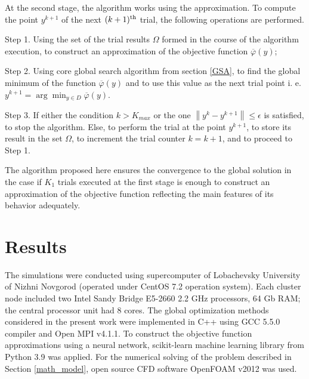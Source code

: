 \documentclass[sensors,article,submit,moreauthors,pdftex]{Definitions/mdpi}
\begin{document}
At the second stage, the algorithm works using the approximation. To compute the point $y^{k+1}$ of the next $(k+1)^{\rm th}$ trial, the following operations are performed.

Step 1. Using the set of the trial results $\Omega$ formed in the course of the algorithm execution, to construct an approximation of the objective function $\overline{\varphi}(y)$;

Step 2. Using core global search algorithm from section \ref{GSA}, to find the global minimum of the function $\overline{\varphi}(y)$ and to use this value as the next trial point i. e. $y^{k+1} = \arg \min_{y \in D} \overline{\varphi}(y)$.

Step 3. If either the condition $k>K_{max}$ or the one $\left\|y^k - y^{k+1}\right\| \leq \epsilon$ is satisfied, to stop the algorithm.
Else, to perform the trial at the point $y^{k+1}$, to store its result in the set $\Omega$, to increment the trial counter $k = k+1$, and to proceed to Step 1.

The algorithm proposed here ensures the convergence to the global solution in the case if $K_1$ trials executed at the first stage is enough to construct an approximation of the objective function reflecting the main features of its behavior adequately.




\section{Results}





The simulations were conducted using supercomputer of Lobachevsky University of Nizhni Novgorod (operated under CentOS 7.2 operation system). Each cluster node included two  Intel Sandy Bridge E5-2660 2.2 GHz processors, 64 Gb RAM; the central processor unit had 8 cores. 
The global optimization methods considered in the present work were implemented in C++ using GCC 5.5.0 compiler and Open MPI v4.1.1. To construct the objective function approximations using a neural network, scikit-learn machine learning library from Python 3.9 was applied. 
For the numerical solving of the problem described in Section \ref{math_model}, open source CFD software OpenFOAM v2012 was used.
\end{document}
